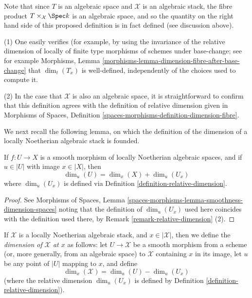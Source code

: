 \noindent
Note that since $T$ is an algebraic space and $\mathcal{X}$ is an
algebraic stack, the fibre product $T \times_{\mathcal{X}} \Spec k$
is an algebraic space, and so the quantity on the right hand side of
this proposed definition is in fact defined (see discussion above).

\begin{remark}
\label{remark-relative-dimension}
(1)
One easily verifies (for example, by using the invariance
of the relative dimension of locally of finite type morphisms of schemes
under base-change; see for example
Morphisms, Lemma \ref{morphisms-lemma-dimension-fibre-after-base-change}
that $\dim_t(T_x)$ is well-defined, independently of the choices
used to compute it.

\medskip\noindent
(2)
In the case that $\mathcal{X}$ is also an algebraic space,
it is straightforward to confirm that this definition agrees with
the definition of relative dimension given in
Morphisms of Spaces, Definition
\ref{spaces-morphisms-definition-dimension-fibre}.
\end{remark}

\noindent
We next recall the following lemma, on which the definition of
the dimension of a locally Noetherian algebraic stack is founded.

\begin{lemma}
\label{lemma-behaviour-of-dimensions-wrt-smooth-morphisms}
If $f: U \to X$ is a smooth morphism of locally Noetherian algebraic
spaces, and
if $u \in |U|$ with image $x \in |X|$, then
$$
\dim_u (U) = \dim_x(X) + \dim_{u} (U_x)
$$
where $\dim_u (U_x)$ is defined via
Definition \ref{definition-relative-dimension}.
\end{lemma}

\begin{proof}
See Morphisms of Spaces, Lemma
\ref{spaces-morphisms-lemma-smoothness-dimension-spaces}
noting that the definition of $\dim_u (U_x)$ used here coincides with
the definition used there, by Remark \ref{remark-relative-dimension} (2).
\end{proof}

\begin{definition}
\label{definition-dimension-for-stacks}
If $\mathcal{X}$ is a locally Noetherian algebraic stack,
and $x \in |\mathcal{X}|$, then we define the
{\it dimension of $\mathcal{X}$ at $x$} as follows:
let $U \to \mathcal{X}$ be a smooth morphism
from a scheme (or, more generally, from an algebraic space) to $\mathcal{X}$
containing $x$ in its image,
let $u$ be any point of $|U|$ mapping to $x$,
and define
$$
\dim_x(\mathcal{X}) =  \dim_u (U) - \dim_{u}( U_x)
$$
(where the relative dimension $\dim_u(U_x)$ is defined
by Definition \ref{definition-relative-dimension}).
\end{definition}

